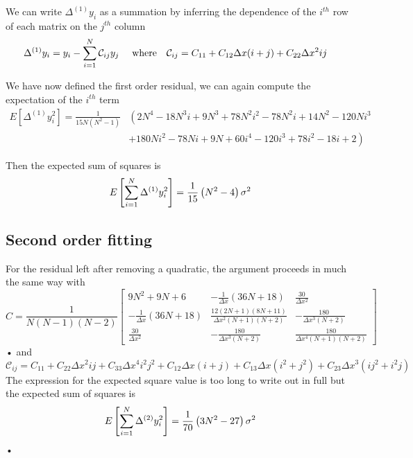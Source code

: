 We can write $\Delta^{(1)} y_{i}$ as a summation by inferring the dependence of the
$i^{th}$ row of each matrix on the $j^{th}$ column
\begin{align}
\Delta^{(1)} y_{i} & = y_{i} - \sum_{i=1}^{N}\mathcal{C}_{ij} y_{j}
& \textrm{ where} &&
\mathcal{C}_{ij} & = C_{11} + C_{12}\Delta x (i+j) + C_{22}\Delta x^{2} ij
\end{align}

We have now defined the first order residual, we can again compute the expectation
of the $i^{th}$ term
\begin{align}
E\left[\Delta^{(1)} y^{2}_{i}\right]  =
\frac{1}{15 N \left(N^{2} - 1\right)} &
\left(2 N^{4} - 18 N^{3} i + 9 N^{3} + 78 N^{2} i^{2} -
      78 N^{2} i + 14 N^{2} - 120 N i^{3} \right. \\
 & \left. + 180 N i^{2} - 78 N i + 9 N + 60 i^{4} - 120 i^{3}
          + 78 i^{2} - 18 i + 2\right)
\end{align}

Then the expected sum of squares is
\begin{equation}
E\left[\sum_{i=1}^{N} \Delta^{(1)} y_{i}^{2}\right] = \frac{1}{15}\left(N^{2} -4\right)\sigma^{2}
\label{eqn: sum of squares k1}
\end{equation}

\subsection{Second order fitting}
For the residual left after removing a quadratic, the  argument proceeds in much
the same way with
\begin{equation}
C = \frac{1}{N(N-1)(N-2)}
\left[\begin{matrix}9 N^{2} + 9 N + 6 & - \frac{1}{\Delta{x}} \left(36 N + 18\right) & \frac{30}{\Delta{x}^{2}}\\- \frac{1}{\Delta{x}} \left(36 N + 18\right) & \frac{12 \left(2 N + 1\right) \left(8 N + 11\right)}{\Delta{x}^{2} \left(N + 1\right) \left(N + 2\right)} & - \frac{180}{\Delta{x}^{3} \left(N + 2\right)}\\\frac{30}{\Delta{x}^{2}} & - \frac{180}{\Delta{x}^{3} \left(N + 2\right)} & \frac{180}{\Delta{x}^{4} \left(N + 1\right) \left(N + 2\right)}\end{matrix}\right]
\label{eqn: C_2}
\end{equation}•
and
\begin{equation}
\mathcal{C}_{ij} = C_{11} + C_{22}\Delta x^{2}ij + C_{33}\Delta x^{4}i^{2}j^{2} + C_{12}\Delta x(i+j) + C_{13}\Delta x (i^{2} + j^2) + C_{23}\Delta x^{3}(ij^{2} + i^{2}j)
\label{eqn: MCC_2}
\end{equation}
The expression for the expected square value is too long to write out in full
but the expected sum of squares is
\begin{equation}
E\left[\sum_{i=1}^{N} \Delta^{(2)} y_{i}^{2}\right] = \frac{1}{70}\left(3N^{2} -27\right)\sigma^{2}
\label{eqn: sum of squares k2}
\end{equation}•

